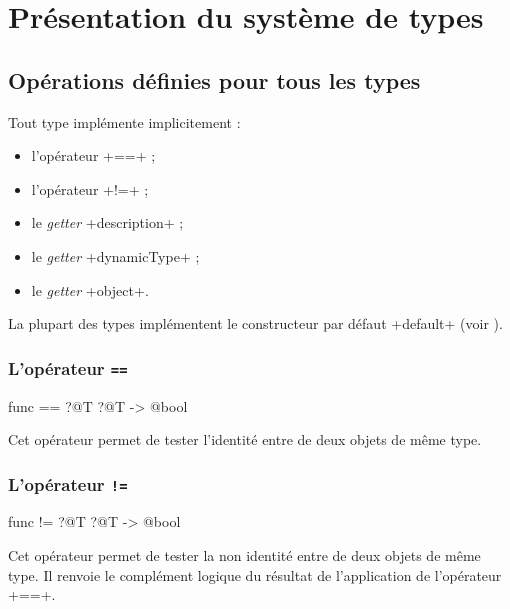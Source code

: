 
\chapter{Présentation du système de types}






\section{Opérations définies pour tous les types}

Tout type implémente implicitement :
\begin{itemize}
  \item l'opérateur \ggs+==+ ;
  \item l'opérateur \ggs+!=+ ;
  \item le \emph{getter} \ggs+description+ ;
  \item le \emph{getter} \ggs+dynamicType+ ;
  \item le \emph{getter} \ggs+object+.
\end{itemize}

La plupart des types implémentent le constructeur par défaut \ggs+default+ (voir ). 


\subsection{L'opérateur \texttt{==}}

\begin{galgascode}
func == ?@T ?@T -> @bool
\end{galgascode}

Cet opérateur permet de tester l'identité entre de deux objets de même type. 

\subsection{L'opérateur \texttt{!=}}

\begin{galgascode}
func != ?@T ?@T -> @bool
\end{galgascode}

Cet opérateur permet de tester la non identité entre de deux objets de même type. Il renvoie le complément logique du résultat de l'application de l'opérateur \ggs+==+.





